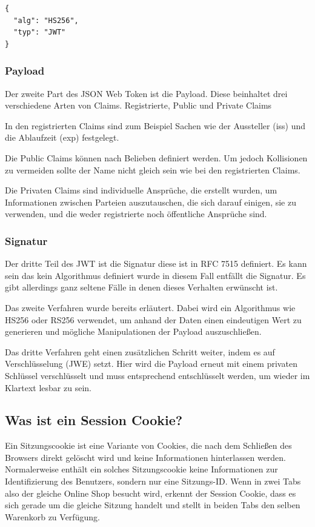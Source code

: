 \begin{lstlisting}
{
  "alg": "HS256",
  "typ": "JWT"
}
\end{lstlisting}

\subsubsection{Payload}
Der zweite Part des JSON Web Token ist die Payload. Diese beinhaltet drei verschiedene Arten von Claims. 
Registrierte, Public und Private Claims

In den registrierten Claims sind zum Beispiel Sachen wie der Aussteller (iss) und die Ablaufzeit (exp) festgelegt.

Die Public Claims können nach Belieben definiert werden. Um jedoch Kollisionen zu vermeiden sollte der Name nicht gleich sein wie bei den registrierten Claims.

Die Privaten Claims sind individuelle Ansprüche, die erstellt wurden, um Informationen zwischen Parteien auszutauschen, die sich darauf einigen, sie zu verwenden, und die weder registrierte noch öffentliche Ansprüche sind.


\subsubsection{Signatur}

Der dritte Teil des JWT ist die Signatur diese ist in RFC 7515 definiert. Es kann sein das kein Algorithmus definiert wurde in diesem Fall entfällt die Signatur. Es gibt allerdings ganz seltene Fälle in denen dieses Verhalten erwünscht ist. 



Das zweite Verfahren wurde bereits erläutert. Dabei wird ein Algorithmus wie HS256 oder RS256 verwendet, um anhand der Daten einen eindeutigen Wert zu generieren und mögliche Manipulationen der Payload auszuschließen.



Das dritte Verfahren geht einen zusätzlichen Schritt weiter, indem es auf Verschlüsselung (JWE) setzt. Hier wird die Payload erneut mit einem privaten Schlüssel verschlüsselt und muss entsprechend entschlüsselt werden, um wieder im Klartext lesbar zu sein.

\subsection{Was ist ein Session Cookie?}


Ein Sitzungscookie ist eine Variante von Cookies, die nach dem Schließen des Browsers direkt gelöscht wird und keine Informationen hinterlassen werden. Normalerweise enthält ein solches Sitzungscookie keine Informationen zur Identifizierung des Benutzers, sondern nur eine Sitzungs-ID.
Wenn in zwei Tabs also der gleiche Online Shop besucht wird, erkennt der Session Cookie, dass es sich gerade um die gleiche Sitzung handelt und stellt in beiden Tabs den selben Warenkorb zu Verfügung.

